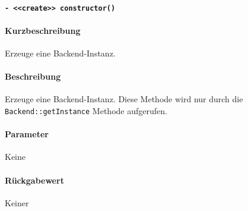 \paragraph{\texttt{- <<create>> constructor()}}%
\paragraph*{Kurzbeschreibung}
Erzeuge eine Backend-Instanz.
\paragraph*{Beschreibung}
Erzeuge eine Backend-Instanz.
Diese Methode wird nur durch die \verb#Backend::getInstance# Methode aufgerufen.
\paragraph*{Parameter}
Keine
\paragraph*{Rückgabewert}
Keiner